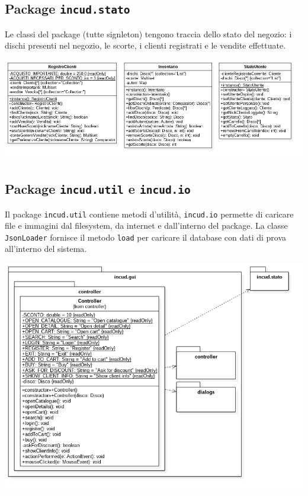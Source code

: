 \subsection{Package \texttt{incud.stato}}

Le classi del package (tutte signleton) tengono traccia dello stato del negozio: i dischi presenti nel negozio, le scorte, i clienti registrati e le vendite effettuate.

\begin{center}
    \includegraphics[width=\textwidth]{diagram/classi-stato.png}
\end{center}

\subsection{Package \texttt{incud.util} e \texttt{incud.io}}

Il package \texttt{incud.util} contiene metodi d'utilità, \texttt{incud.io} permette di caricare file e immagini dal filesystem, da internet e dall'interno del package. La classe \texttt{JsonLoader} fornisce il metodo \texttt{load} per caricare il database con dati di prova all'interno del sistema.

\begin{center}
    \includegraphics[width=\textwidth]{diagram/classi-util-io.png}
\end{center}

